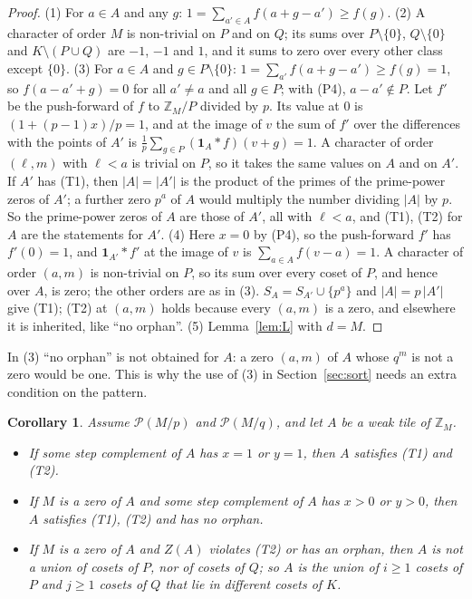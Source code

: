 \documentclass[11pt,a4paper]{amsart}
\newtheorem{corollary}[theorem]{Corollary}
\theoremstyle{definition}
\theoremstyle{remark}
\newcommand{\Z}{\mathbb{Z}}
\newcommand{\one}{\mathbf{1}}
\newcommand{\PP}{\mathcal{P}}
\begin{document}
\begin{proof}
(1) For $a\in A$ and any $g$: $1=\sum_{a'\in A}f(a+g-a')\ge f(g)$. (2) A character of order $M$ is non-trivial
on $P$ and on $Q$; its sums over $P\setminus\{0\}$, $Q\setminus\{0\}$ and $K\setminus(P\cup Q)$ are $-1$, $-1$
and $1$, and it sums to zero over every other class except $\{0\}$. (3) For $a\in A$ and
$g\in P\setminus\{0\}$: $1=\sum_{a'}f(a+g-a')\ge f(g)=1$, so $f(a-a'+g)=0$ for all $a'\ne a$ and all $g\in P$;
with (P4), $a-a'\notin P$. Let $f'$ be the push-forward of $f$ to $\Z_M/P$ divided by $p$. Its value at $0$ is
$(1+(p-1)x)/p=1$, and at the image of $v$ the sum of $f'$ over the differences with the points of $A'$ is
$\frac1p\sum_{g\in P}(\one_A*f)(v+g)=1$. A character of order $(\ell,m)$ with $\ell<a$ is trivial on $P$, so it
takes the same values on $A$ and on $A'$. If $A'$ has (T1), then $|A|=|A'|$ is the product of the primes of the
prime-power zeros of $A'$; a further zero $p^a$ of $A$ would multiply the number dividing $|A|$ by $p$. So the
prime-power zeros of $A$ are those of $A'$, all with $\ell<a$, and (T1), (T2) for $A$ are the statements for
$A'$. (4) Here $x=0$ by (P4), so the push-forward $f'$ has $f'(0)=1$, and $\one_{A'}*f'$ at the image of $v$ is
$\sum_{a\in A}f(v-a)=1$. A character of order $(a,m)$ is non-trivial on $P$, so its sum over every coset of
$P$, and hence over $A$, is zero; the other orders are as in (3). $S_A=S_{A'}\cup\{p^a\}$ and $|A|=p\,|A'|$ give
(T1); (T2) at $(a,m)$ holds because every $(a,m)$ is a zero, and elsewhere it is inherited, like ``no orphan''.
(5) Lemma~\ref{lem:L} with $d=M$.
\end{proof}

In (3) ``no orphan'' is not obtained for $A$: a zero $(a,m)$ of $A$ whose $q^m$ is not a zero would be one. This
is why the use of (3) in Section~\ref{sec:sort} needs an extra condition on the pattern.

\begin{corollary}\label{cor:TU}
Assume $\PP(M/p)$ and $\PP(M/q)$, and let $A$ be a weak tile of $\Z_M$.
\begin{itemize}
\item[(T)] If some step complement of $A$ has $x=1$ or $y=1$, then $A$ satisfies \textup{(T1)} and \textup{(T2)}.
\item[(U)] If $M$ is a zero of $A$ and some step complement of $A$ has $x>0$ or $y>0$, then $A$ satisfies
\textup{(T1)}, \textup{(T2)} and has no orphan.
\item[(H)] If $M$ is a zero of $A$ and $Z(A)$ violates \textup{(T2)} or has an orphan, then $A$ is not a union
of cosets of $P$, nor of cosets of $Q$; so $A$ is the union of $i\ge1$ cosets of $P$ and $j\ge1$ cosets of $Q$
that lie in different cosets of $K$.
\end{itemize}
\end{corollary}
\end{document}
